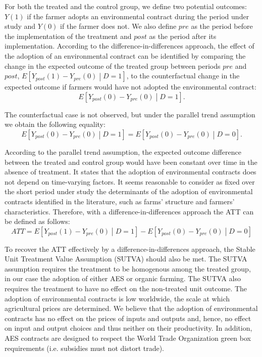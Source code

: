 \begin{Article}
\begin{refsection}[Lassalas]
For both the treated and the control group, we define two potential
outcomes: \(Y(1)\) if the farmer adopts an environmental contract during
the period under study and \(Y(0)\) if the farmer does not. We also
define \(pre\) as the period before the implementation of the treatment
and \(post\) as the period after its implementation. According to the
difference-in-differences approach, the effect of the adoption of an
environmental contract can be identified by comparing the change in the
expected outcome of the treated group between periods \(pre\) and
\(post\),
\(E\left\lbrack Y_{post}(1) - Y_{pre}(0) \middle | D = 1 \right\rbrack\),
to the counterfactual change in the expected outcome if farmers would
have not adopted the environmental contract:
\[
E\left\lbrack Y_{post}(0) - Y_{pre}(0) \middle| D = 1 \right\rbrack.
\]

The counterfactual case is not observed, but under the parallel trend
assumption we obtain the following equality:
\[
E\left\lbrack Y_{post}(0) - Y_{pre}(0) \middle| D = 1 \right\rbrack = E\left\lbrack Y_{post}(0) - Y_{pre}(0) \middle| D = 0 \right\rbrack.
\]

According to the parallel trend assumption, the expected outcome
difference between the treated and control group would have been
constant over time in the absence of treatment. It states that the
adoption of environmental contracts does not depend on time-varying
factors. It seems reasonable to consider as fixed over the short period
under study the determinants of the adoption of environmental contracts
identified in the literature, such as farms' structure and farmers'
characteristics. Therefore, with a difference-in-differences approach
the ATT can be defined as follows:
\begin{equation}
ATT = E\left\lbrack Y_{post}(1) - Y_{pre}(0) \middle| D = 1 \right\rbrack - E\left\lbrack Y_{post}(0) - Y_{pre}(0) \middle| D = 0 \right\rbrack
\end{equation}

To recover the ATT effectively by a difference-in-differences approach,
the Stable Unit Treatment Value Assumption (SUTVA) should also be met.
The SUTVA assumption requires the treatment to be homogenous among the
treated group, in our case the adoption of either AES or organic
farming. The SUTVA also requires the treatment to have no effect on the
non-treated unit outcome. The adoption of environmental contracts is low
worldwide, the scale at which agricultural prices are determined. We
believe that the adoption of environmental contracts has no effect on
the prices of inputs and outputs and, hence, no effect on input and
output choices and thus neither on their productivity. In addition, AES
contracts are designed to respect the World Trade Organization green box
requirements (i.e. subsidies must not distort trade).


\end{refsection}
\end{Article}
